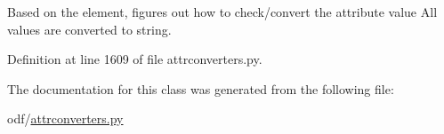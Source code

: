 Based on the element, figures out how to check/convert the attribute value All values are converted to string. 



Definition at line 1609 of file attrconverters.\+py.



The documentation for this class was generated from the following file\+:\begin{DoxyCompactItemize}
\item 
odf/\hyperlink{attrconverters_8py}{attrconverters.\+py}\end{DoxyCompactItemize}
